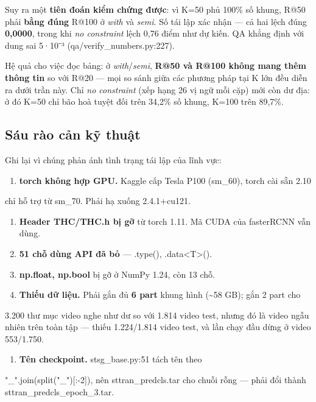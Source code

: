\documentclass[11pt,a4paper]{article}
\newcommand{\code}[1]{{\ttfamily\small\color{codetext}#1}}
\begin{document}
Suy ra một \textbf{tiên đoán kiểm chứng được}: vì K=50 phủ 100\% số khung, R@50 phải \textbf{bằng đúng} R@100 ở \emph{with} và \emph{semi}. Số tái lập xác nhận --- cả hai lệch đúng \textbf{0,0000}, trong khi \emph{no constraint} lệch 0,76 điểm như dự kiến. QA khẳng định với dung sai 5·10⁻³ (\code{qa/verify\_numbers.py:227}).

Hệ quả cho việc đọc bảng: ở \emph{with}/\emph{semi}, \textbf{R@50 và R@100 không mang thêm thông tin} so với R@20 --- mọi so sánh giữa các phương pháp tại K lớn đều diễn ra dưới trần này. Chỉ \emph{no constraint} (xếp hạng 26 vị ngữ mỗi cặp) mới còn dư địa: ở đó K=50 chỉ bão hoà tuyệt đối trên 34,2\% số khung, K=100 trên 89,7\%.

\subsection{Sáu rào cản kỹ thuật}
Ghi lại vì chúng phản ánh tình trạng tái lập của lĩnh vực:

\begin{enumerate}\itemsep2pt
\item \textbf{torch không hợp GPU.} Kaggle cấp Tesla P100 (sm\_60), torch cài sẵn 2.10
\end{enumerate}
chỉ hỗ trợ từ sm\_70. Phải hạ xuống 2.4.1+cu121.

\begin{enumerate}\itemsep2pt
\item \textbf{Header \code{THC/THC.h} bị gỡ} từ torch 1.11. Mã CUDA của fasterRCNN vẫn dùng.
\item \textbf{51 chỗ dùng API đã bỏ} --- \code{.type()}, \code{.data<T>()}.
\item \textbf{\code{np.float}, \code{np.bool}} bị gỡ ở NumPy 1.24, còn 13 chỗ.
\item \textbf{Thiếu dữ liệu.} Phải gắn đủ \textbf{6 part} khung hình (\textasciitilde{}58 GB); gắn 2 part cho
\end{enumerate}
3.200 thư mục video nghe như dư so với 1.814 video test, nhưng đó là video ngẫu nhiên trên toàn tập --- thiếu 1.224/1.814 video test, và lần chạy đầu dừng ở video 553/1.750.

\begin{enumerate}\itemsep2pt
\item \textbf{Tên checkpoint.} \code{stsg\_base.py:51} tách tên theo
\end{enumerate}
\code{"\_".join(split("\_")[:-2])}, nên \code{sttran\_predcls.tar} cho chuỗi rỗng --- phải đổi thành \code{sttran\_predcls\_epoch\_3.tar}.
\end{document}
